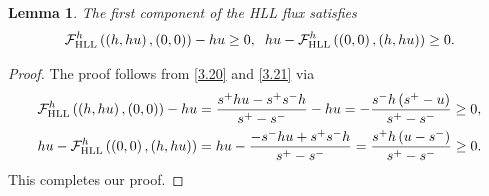 \documentclass[11pt,a4paper,center,notitlepage]{article}
\numberwithin{equation}{section}
\newtheorem{lemma}{Lemma}
\begin{document}
\begin{lemma}
The first component of the HLL flux satisfies
\begin{align}
\mathcal{F}_{\rm HLL}^h\left( {\left( {h,hu} \right),\left( {0,0} \right)} \right) - hu \ge 0, \hspace{2mm} hu - \mathcal{F}_{\rm HLL}^h\left( {\left( {0,0} \right),\left( {h,hu} \right)} \right) \ge 0.
\end{align}
\end{lemma}

\begin{proof}
The proof follows from \eqref{3.20} and \eqref{3.21} via
\begin{align*}
\mathcal{F}_{\rm HLL}^h\left( {\left( {h,hu} \right),\left( {0,0} \right)} \right) - hu &= \frac{{{s^ + }hu - {s^ + }{s^ - }h}}{{{s^ + } - {s^ - }}} - hu =  - \frac{{{s^ - }h\left( {{s^ + } - u} \right)}}{{{s^ + } - {s^ - }}} \ge 0,\\
hu - \mathcal{F}_{\rm HLL}^h\left( {\left( {0,0} \right),\left( {h,hu} \right)} \right) &= hu - \frac{{ - {s^ - }hu + {s^ + }{s^ - }h}}{{{s^ + } - {s^ - }}} = \frac{{{s^ + }h\left( {u - {s^ - }} \right)}}{{{s^ + } - {s^ - }}} \ge 0.
\end{align*}
This completes our proof.
\end{proof}
\end{document}
